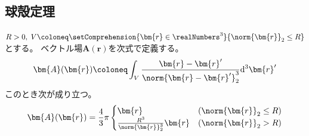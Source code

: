         \subsection{球殻定理}
            \begin{shadebox}
                $R>0,\;V \coloneq \setComprehension{\bm{r}\in\realNumbers^3}{\norm{\bm{r}}_2\leq R}$とする。
                ベクトル場$\bm{A}(\bm{r})$を次式で定義する。
                \[ \bm{A}(\bm{r}) \coloneq \int_V \frac{\bm{r}-\bm{r}'}{\norm{\bm{r}-\bm{r}'}_2^3} \mathrm{d}^3\bm{r}' \]
                このとき次が成り立つ。
                \[
                    \bm{A}(\bm{r}) = \frac{4}{3}\pi
                    \begin{cases}
                        \bm{r} & (\norm{\bm{r}}_2\leq R) \\
                        \frac{R^3}{\norm{\bm{r}}_2^3}\bm{r} & (\norm{\bm{r}}_2 > R)
                    \end{cases}
                \]
            \end{shadebox}
